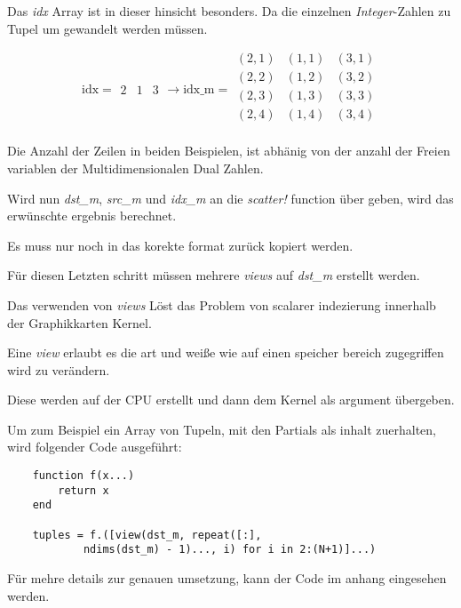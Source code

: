 Das \textit{idx} Array ist in dieser hinsicht besonders.
Da die einzelnen \textit{Integer}-Zahlen zu Tupel um gewandelt werden müssen. 

\begin{equation}
\text{idx}= 
\begin{matrix}
 2 & 1 & 3
\end{matrix}
\rightarrow
\text{idx\_m} = 
\begin{matrix}
 (2, 1) & (1, 1) & (3, 1) \\ 
 (2, 2) & (1, 2) & (3, 2) \\
 (2, 3) & (1, 3) & (3, 3) \\
 (2, 4) & (1, 4) & (3, 4) \\
\end{matrix}
\end{equation}

Die Anzahl der Zeilen in beiden Beispielen, ist abhänig von der anzahl der Freien variablen  
der Multidimensionalen Dual Zahlen.

Wird nun \textit{dst\_m}, \textit{src\_m} und \textit{idx\_m} an die \textit{scatter!} function über
geben, wird das erwünschte ergebnis berechnet. 

Es muss nur noch in das korekte format zurück kopiert werden. 

Für diesen Letzten schritt müssen mehrere \textit{views} auf
\textit{dst\_m} erstellt werden.

Das verwenden von \textit{views} Löst das Problem von scalarer indezierung innerhalb der Graphikkarten Kernel. 

Eine \textit{view} erlaubt es die art und weiße wie auf einen speicher bereich zugegriffen wird zu verändern.

Diese werden auf der CPU erstellt und dann dem Kernel als argument übergeben.

Um zum Beispiel ein Array von Tupeln, mit den Partials als inhalt zuerhalten, wird folgender Code ausgeführt:

\begin{verbatim}
	function f(x...)
		return x
	end
	
	tuples = f.([view(dst_m, repeat([:], 
	        ndims(dst_m) - 1)..., i) for i in 2:(N+1)]...)
\end{verbatim}


Für mehre details zur genauen umsetzung, kann der Code im anhang eingesehen werden.

